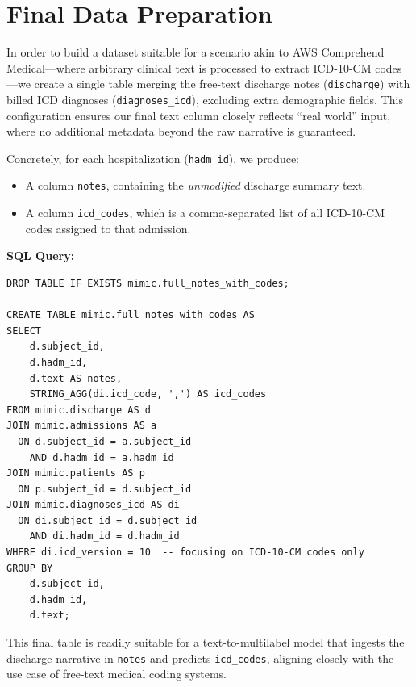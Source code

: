 \section{Final Data Preparation}
\label{sec:final-data-prep}

In order to build a dataset suitable for a scenario akin to AWS Comprehend Medical—where arbitrary clinical text is processed to extract ICD-10-CM codes—we create a single table merging the free-text discharge notes (\texttt{discharge}) with billed ICD diagnoses (\texttt{diagnoses\_icd}), excluding extra demographic fields. This configuration ensures our final text column closely reflects “real world” input, where no additional metadata beyond the raw narrative is guaranteed. 

Concretely, for each hospitalization (\texttt{hadm\_id}), we produce:
\begin{itemize}
    \item A column \texttt{notes}, containing the \textit{unmodified} discharge summary text. 
    \item A column \texttt{icd\_codes}, which is a comma-separated list of all ICD-10-CM codes assigned to that admission.
\end{itemize}

\noindent \textbf{SQL Query:}
\begin{verbatim}
DROP TABLE IF EXISTS mimic.full_notes_with_codes;

CREATE TABLE mimic.full_notes_with_codes AS
SELECT
    d.subject_id,
    d.hadm_id,
    d.text AS notes,
    STRING_AGG(di.icd_code, ',') AS icd_codes
FROM mimic.discharge AS d
JOIN mimic.admissions AS a
  ON d.subject_id = a.subject_id
    AND d.hadm_id = a.hadm_id
JOIN mimic.patients AS p
  ON p.subject_id = d.subject_id
JOIN mimic.diagnoses_icd AS di
  ON di.subject_id = d.subject_id
    AND di.hadm_id = d.hadm_id
WHERE di.icd_version = 10  -- focusing on ICD-10-CM codes only
GROUP BY
    d.subject_id,
    d.hadm_id,
    d.text;
\end{verbatim}


\noindent This final table is readily suitable for a text-to-multilabel model that ingests the discharge narrative in \texttt{notes} and predicts \texttt{icd\_codes}, aligning closely with the use case of free-text medical coding systems.



